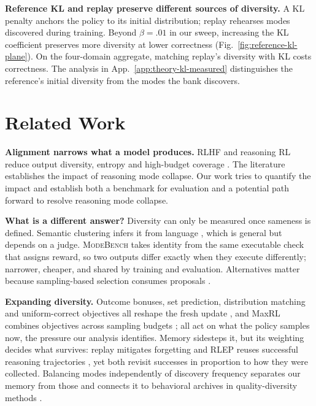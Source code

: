 \documentclass{article}
\newcommand{\1}{\mathbf 1}
\newcommand{\mb}{\textsc{ModeBench}}
\theoremstyle{remark}
\theoremstyle{definition}
\theoremstyle{plain}
\begin{document}
\textbf{Reference KL and replay preserve different sources of diversity.}
A KL penalty anchors the policy to its initial distribution; replay rehearses modes discovered during training. Beyond $\beta=.01$ in our sweep, increasing the KL coefficient preserves more diversity at lower correctness (Fig.~\ref{fig:reference-kl-plane}). On the four-domain aggregate, matching replay's diversity with KL costs correctness. The analysis in App.~\ref{app:theory-kl-measured} distinguishes the reference's initial diversity from the modes the bank discovers.

\section{Related Work}
\label{sec:related}

\textbf{Alignment narrows what a model produces.} RLHF and reasoning RL reduce
output diversity, entropy and high-budget coverage
\citep{kirk2024understanding,dang2025diversity,cui2025entropy,yue2025rlvrlimit}.
The literature establishes the impact of reasoning mode collapse. Our work tries to quantify the impact and establish both a benchmark for evaluation and a potential path forward to resolve reasoning mode collapse.

\textbf{What is a different answer?}
Diversity can only be measured once sameness is defined.
Semantic clustering infers it from language \citep{farquhar2024detecting}, which is general but depends on a judge.
\mb{} takes identity from the same executable check that assigns reward, so two outputs differ exactly when they execute differently; narrower, cheaper, and shared by training and evaluation.
Alternatives matter because sampling-based selection consumes proposals
\citep{brown2024monkeys,snell2024testtime,cobbe2021training,lightman2023lets}.

\textbf{Expanding diversity.}
Outcome bonuses, set prediction, distribution matching and uniform-correct objectives all reshape the fresh update \citep{song2025outcome,chen2025passktraining,li2025divergence,li2026setpo,li2026distribution,lochab2026ucpo}, and MaxRL combines objectives across sampling budgets \citep{tajwar2026maxrl};
all act on what the policy samples now, the pressure our analysis
identifies.
Memory sidesteps it, but its weighting decides what survives: replay mitigates forgetting \citep{lin1992selfimproving,rolnick2019replay} and RLEP reuses successful reasoning trajectories \citep{zhang2025rlep}, yet both revisit successes in proportion to how they were collected.
Balancing modes independently of discovery frequency separates our memory from those and connects it to behavioral archives in quality-diversity methods \citep{mouret2015illuminating,ecoffet2021return}.
\end{document}
